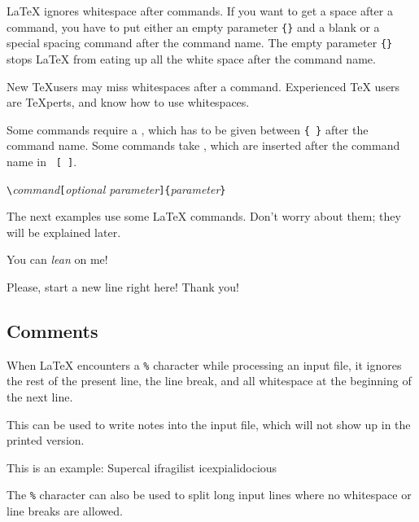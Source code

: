 \LaTeX{} ignores whitespace after commands. If you want to get a
space after a command, you have to
put either an empty parameter \verb|{}| and a blank or a special spacing command after the
command name. The empty parameter \verb|{}| stops \LaTeX{} from eating up all the white space after
the command name. 

\begin{example}
New \TeX users may miss whitespaces
after a command. %
Experienced \TeX{} users are
\TeX perts, and know how to use
whitespaces. %
\end{example}

Some commands require a , which has to be given between
 \verb|{ }| after the command name. Some commands take
, which are inserted after the command name in
~\verb|[ ]|.
\begin{code}
\verb|\|\textit{command}\verb|[|\textit{optional parameter}\verb|]{|\textit{parameter}\verb|}|
\end{code}
The next examples use some \LaTeX{}
commands. Don't worry about them; they will be explained later.

\begin{example}
You can \textsl{lean} on me!
\end{example}
\begin{example}
Please, start a new line
right here!\newline
Thank you!
\end{example}

\subsection{Comments}

When \LaTeX{} encounters a \verb|%| character while processing an input file,
it ignores the rest of the present line, the line break, and all
whitespace at the beginning of the next line.

This can be used to write notes into the input file, which will not show up
in the printed version.

\begin{example}
This is an %
example: Supercal%
              ifragilist%
    icexpialidocious
\end{example}

The \texttt{\%} character can also be used to split long input lines where no
whitespace or line breaks are allowed.

